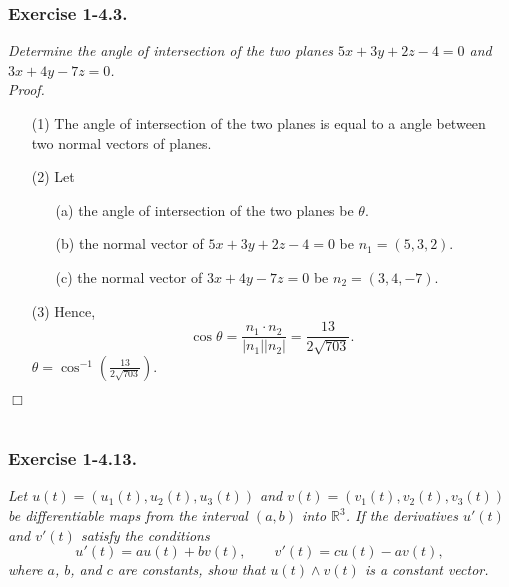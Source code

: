 \documentclass{article}
\begin{document}



\subsubsection*{Exercise 1-4.3.}
\emph{Determine the angle of intersection of the two planes
$5x+3y+2z-4=0$ and $3x+4y-7z=0$.} \\



\emph{Proof.}
\begin{enumerate}
\item[(1)]
The angle of intersection of the two planes
is equal to a angle between two normal vectors of planes.
\item[(2)]
Let
  \begin{enumerate}
  \item[(a)]
  the angle of intersection of the two planes be $\theta$.
  \item[(b)]
  the normal vector of $5x+3y+2z-4=0$ be $n_1 = (5,3,2)$.
  \item[(c)]
  the normal vector of $3x+4y-7z=0$ be $n_2 = (3,4,-7)$.
  \end{enumerate}
\item[(3)]
Hence,
$$\cos\theta = \frac{n_1 \cdot n_2}{|n_1||n_2|} = \frac{13}{2\sqrt{703}}.$$
$\theta = \cos^{-1}\left( \frac{13}{2\sqrt{703}} \right)$.
\end{enumerate}
$\Box$ \\\\






\subsubsection*{Exercise 1-4.13.}
\emph{Let $u(t) = (u_1(t), u_2(t), u_3(t))$ and $v(t) = (v_1(t), v_2(t), v_3(t))$
be differentiable maps from the interval $(a,b)$ into $\mathbb{R}^3$.
If the derivatives $u'(t)$ and $v'(t)$ satisfy the conditions
\[
  u'(t) = au(t) + bv(t),
  \qquad
  v'(t) = cu(t) - av(t),
\]
where $a$, $b$, and $c$ are constants, show that
$u(t) \wedge v(t)$ is a constant vector.} \\
\end{document}
